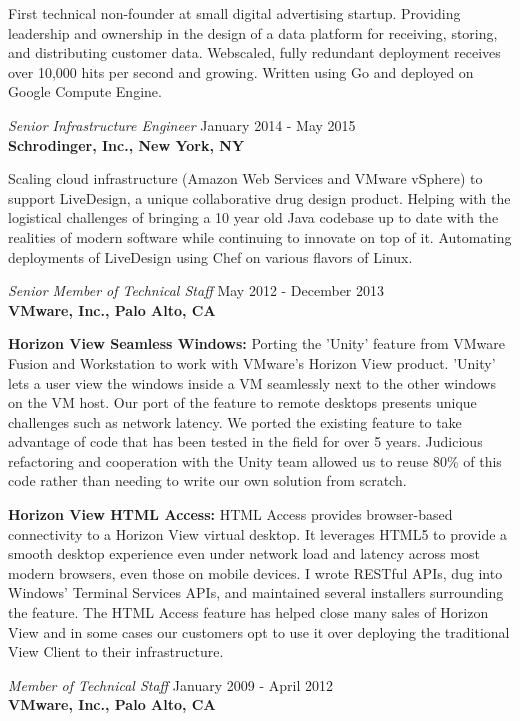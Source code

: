 \documentclass[overlapped,line,margin]{res}
\begin{document}
\begin{resume}
  First technical non-founder at small digital advertising startup. Providing
  leadership and ownership in the design of a data platform for receiving,
  storing, and distributing customer data. Webscaled, fully redundant
  deployment receives over 10,000 hits per second and growing. Written using Go
  and deployed on Google Compute Engine.

{\sl Senior Infrastructure Engineer} \hfill January 2014 - May 2015 \\
\textbf{Schrodinger, Inc., New York, NY}

  Scaling cloud infrastructure (Amazon Web Services and VMware vSphere) to
  support LiveDesign, a unique collaborative drug design product. Helping with
  the logistical challenges of bringing a 10 year old Java codebase up to date
  with the realities of modern software while continuing to innovate on top of
  it. Automating deployments of LiveDesign using Chef on various flavors of
  Linux.

{\sl Senior Member of Technical Staff} \hfill May 2012 - December 2013 \\
\textbf{VMware, Inc., Palo Alto, CA}

  \textbf{Horizon View Seamless Windows:} Porting the 'Unity' feature
  from VMware Fusion and Workstation to work with VMware's Horizon View product.
  'Unity' lets a user view the windows inside a VM seamlessly next to the other
  windows on the VM host. Our port of the feature to remote desktops presents
  unique challenges such as network latency. We ported the existing feature to
  take advantage of code that has been tested in the field for over 5 years.
  Judicious refactoring and cooperation with the Unity team allowed us to reuse
  80\% of this code rather than needing to write our own solution from scratch.

  \textbf{Horizon View HTML Access:} HTML Access provides browser-based
  connectivity to a Horizon View virtual desktop. It leverages HTML5 to provide
  a smooth desktop experience even under network load and latency across most
  modern browsers, even those on mobile devices. I wrote RESTful APIs, dug into
  Windows' Terminal Services APIs, and maintained several installers
  surrounding the feature. The HTML Access feature has helped close many sales
  of Horizon View and in some cases our customers opt to use it over deploying
  the traditional View Client to their infrastructure.

{\sl Member of Technical Staff} \hfill January 2009 - April 2012 \\
\textbf{VMware, Inc., Palo Alto, CA}


\end{resume}
\end{document}
